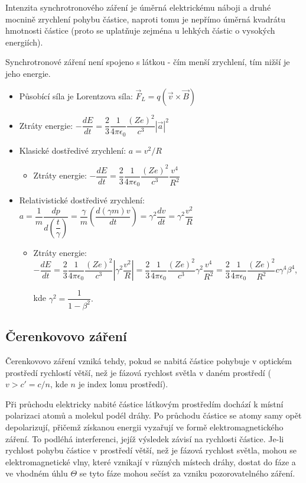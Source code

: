 \documentclass[../../main.tex]{subfiles}
\begin{document}
Intenzita synchrotronového záření je úměrná elektrickému náboji a druhé mocnině zrychlení pohybu částice, naproti tomu je nepřímo úměrná kvadrátu  hmotnosti částice (proto se uplatňuje zejména u lehkých částic o vysokých energiích).

Synchrotronové záření není spojeno s látkou - čím menší zrychlení, tím nižší je jeho energie.

\begin{itemize}
	\item Působící síla je Lorentzova síla: $\vec F_L = q (\vec v \times \vec B)$
	\item Ztráty energie: $- \dfrac{dE}{dt} = \dfrac{2}{3} \dfrac{1}{4 \pi \epsilon_0} \dfrac{(Ze)^2}{c^3} \left| \vec a \right| ^2$
	\item Klasické dostředivé zrychlení: $a = v^2 /R$
	\begin{itemize}
	\item Ztráty energie: $- \dfrac{dE}{dt} = \dfrac{2}{3} \dfrac{1}{4 \pi \epsilon_0} \dfrac{(Ze)^2}{c^3} \dfrac{v^4}{R^2}$
	\end{itemize}
\item Relativistické dostředivé zrychlení: $a = \dfrac{1}{m} \dfrac{dp}{d\left(\dfrac{t}{\gamma}\right) } = \dfrac{\gamma}{m} \left( \dfrac{d(\gamma m) v}{dt} \right) = \gamma^2 \dfrac{dv}{dt} =  \gamma^2 \dfrac{v^2}{R}$
\begin{itemize}
	\item Ztráty energie: $- \dfrac{dE}{dt} = \dfrac{2}{3} \dfrac{1}{4 \pi \epsilon_0} \dfrac{(Ze)^2}{c^3} \left| \gamma^2 \dfrac{v^2}{R} \right| = \dfrac{2}{3} \dfrac{1}{4 \pi \epsilon_0} \dfrac{(Ze)^2}{c^3} \gamma ^2 \dfrac{v^4}{R^2} =  \dfrac{2}{3} \dfrac{1}{4 \pi \epsilon_0} \dfrac{(Ze)^2}{R^2} c \gamma^4 \beta^4$,
	
	kde $\gamma^2 = \dfrac{1}{1 - \beta^2}.$
\end{itemize}
\end{itemize}

\subsection{Čerenkovovo záření}

Čerenkovovo záření vzniká tehdy, pokud se nabitá částice pohybuje v optickém prostředí rychlostí větší, než je fázová rychlost světla v daném prostředí ($v > c' = c/n$, kde $n$ je index lomu prostředí).

Při průchodu elektricky nabité částice látkovým prostředím dochází k místní polarizaci atomů a molekul podél dráhy. Po průchodu částice se atomy samy opět depolarizují, přičemž získanou energii vyzařují ve formě elektromagnetického záření. To podléhá interferenci, jejíž výsledek závisí na rychlosti částice. Je-li rychlost pohybu částice v prostředí větší, než je  fázová rychlost světla, mohou se elektromagnetické vlny, které vznikají v různých místech dráhy, dostat do fáze a ve vhodném úhlu $\varTheta$ se tyto fáze mohou sečíst za vzniku pozorovatelného záření.
\end{document}
